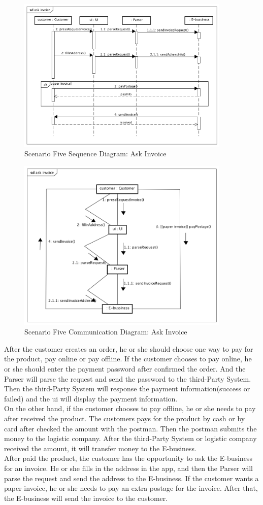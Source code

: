 \documentclass[12pt]{scrreprt}
\begin{document}
\begin{figure}[H]
  \centering\includegraphics[width=4in]{DocumentRes/5SequenceDiagram_askInvoice.png}
  \caption{Scenario Five Sequence Diagram: Ask Invoice}
\end{figure}
\begin{figure}[H]
  \centering\includegraphics[width=4in]{DocumentRes/5CommunicationDiagram_askInvoice.png}
  \caption{Scenario Five Communication Diagram: Ask Invoice}
\end{figure}
After the customer creates an order, he or she should choose one way to pay for the product, pay online or pay offline. If the customer chooses to pay online, he or she should enter the payment password after confirmed  the order. And the Parser will parse the request and send the password to the third-Party System. Then the third-Party System will response the payment information(success or failed) and the ui will display the payment information.\\
On the other hand, if the customer chooses to pay offline, he or she needs to pay after received the product. The customers pays for the product by cash or by card after checked the amount with the postman. Then the postman submits the money to the logistic company. After the third-Party System or logistic company received the amount, it will transfer money to the E-business.\\
After paid the product, the customer has the opportunity to ask the E-business for an invoice. He or she fills in the address in the app, and then the Parser will parse the request and send the address to the E-business. If the customer wants a paper invoice, he or she needs to pay an extra postage for the invoice. After that, the E-business will send the invoice to the customer.
\end{document}
